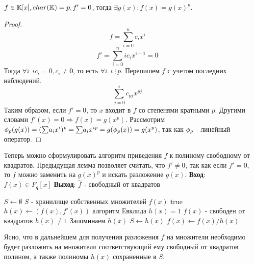 \begin{lem}
  $ f \in \mathbb{K}[x], char(\mathbb{K}) = p, f' = 0 $, тогда $ \exists g(x) : f(x) = g(x)^p $. 
\end{lem}

\begin{proof}
  \[ f = \overset{n}{\underset{i=0}{\sum}} c_{i}x^{i} \]
  \[ f' = \overset{n}{\underset{i=0}{\sum}} ic_{i}x^{i - 1} = 0 \]
  Тогда $ \forall i ~~ ic_i = 0, c_i \ne 0 $, то есть $ \forall i ~~ i ~ \vdots ~ p $. 
  Перепишем $ f $ с учетом последних наблюдений.
  \[ \overset{s}{\underset{j = 0}{\sum}} c_{pj}x^{pj} \]
  Таким образом, если $ f' = 0 $, то $ x $ входит в $ f $ со степенями кратными $ p $. Другими словами
  $ f'(x) = 0 \Rightarrow f(x) = g(x^p) $. 
  Рассмотрим $ \phi_{p}(g(x)) = ({\sum}a_ix^i)^p = {\sum}a_ix^{ip} = g(\phi_{p}(x)) = g(x^p) $, так как $ \phi_{p} $ -
  линейный оператор. 
\end{proof}

Теперь можно сформулировать алгоритм приведения $ f $ к полиному свободному от квадратов. Предыдущая лемма
позволяет считать, что $ f' \ne 0 $, так как если $ f' = 0 $, то $ f $ можно заменить на $ g(x)^p $ и искать
разложение $ g(x) $. \newline  \newline
{\bf{Вход}}: $ f(x) \in F_q[x] $ {\bf{Выход}}: $ \overset{\sim}{f} $ - свободный от квадратов \newline

\begin{codebox}
    \li $ S \gets \emptyset $ \Comment $ S $ - хранилище собственных множителей $ f(x) $
    \li \While true
      \li \Do $ h(x) \gets (f(x), f'(x)) $ \Comment алгоритм Евклида
      \li \If $ h(x) = 1 $ 
        \li \Do \Return \Comment $ f(x) $ - свободен от квадратов
	\li \End
      \li \If $ h(x) \ne 1 $
       \li \Comment Запоминаем $ h(x) $
        \li \Do $ S \gets h(x) $ 
	  \li $ f(x) \gets f(x) / h(x) $
\end{codebox}

Ясно, что в дальнейшем для получения разложения $ f $ на множители необходимо будет разложить на множители
соответствующий ему свободный от квадратов полином, а также полиномы $ h(x) $ сохраненные в $ S $.



